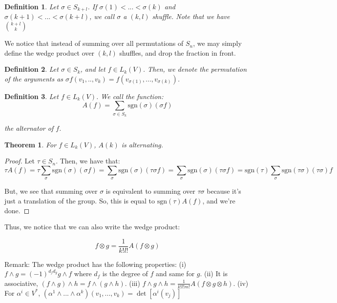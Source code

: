 \documentclass[10pt]{article}
\newtheorem{definition}{Definition}[section]
\newtheorem{theorem}{Theorem}[section]
\begin{document}
\begin{definition}
Let $\sigma \in S_{k+l}$. If $\sigma(1) < ... < \sigma(k)$ and $\sigma(k+1) < ... < \sigma(k+l)$, we call $\sigma$ a $(k,l)$ shuffle. Note that we have $\binom{k+l}{k}$
\end{definition}

We notice that instead of summing over all permutations of $S_n$, we may simply define the wedge product over $(k,l)$ shuffles, and drop the fraction in front.

\begin{definition}
Let $\sigma\in S_k$, and let $f \in L_k(V)$. Then, we denote the permutation of the arguments as $\sigma f (v_1,..,v_k) = f(v_{\sigma(1)},...,v_{\sigma(k)})$.
\end{definition}

\begin{definition}
Let $f \in L_k(V)$. We call the function:
$$ A(f) = \sum_{\sigma \in S_k} \text{sgn} (\sigma) (\sigma f)$$

the alternator of $f$.

\end{definition}

\begin{theorem}
For $f \in L_k(V)$, $A(k)$ is alternating.
\end{theorem}

\begin{proof}
Let $\tau \in S_n$. Then, we have that:
$$ \tau A(f) = \tau \sum_{\sigma}\text{sgn} (\sigma) (\sigma f) = \sum_{\sigma} \text{sgn} (\sigma) (\tau \sigma f) = \sum_{\sigma} \text{sgn} (\sigma) (\tau \sigma f) = \text{sgn}(\tau) \sum_\sigma \text{sgn}(\tau \sigma) (\tau \sigma) f $$

But, we see that summing over $\sigma$ is equivalent to summing over $\tau \sigma$ because it’s just a translation of the group. So, this is equal to $\text{sgn}(\tau) A(f)$, and we’re done.
\end{proof}

Thus, we notice that we can also write the wedge product:

$$ f \otimes g = \frac{1}{k! l!} A(f \otimes g)$$

Remark: The wedge product has the following properties:
(i) $f \wedge g = (-1)^{d_f d_g} g \wedge f$ where $d_f$ is the degree of $f$ and same for $g$.
(ii) It is associative, $(f \wedge g) \wedge h = f \wedge(g \wedge h)$.
(iii) $f \wedge g \wedge h = \frac{1}{k! l! m!} A(f \otimes g \otimes h)$.
(iv) For $\alpha^i \in V^*$, $(\alpha^1 \wedge...\wedge \alpha^k) (v_1,...,v_k) =
\det[\alpha^i(v_j)]$
\end{document}
